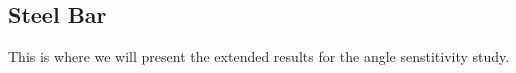\subsection{Steel Bar}
\label{sec:extendedsteelbar}

This is where we will present the extended results for the angle senstitivity
study.
